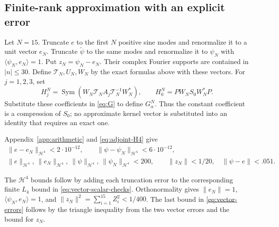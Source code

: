 \documentclass[a4paper,11pt]{article}
\numberwithin{equation}{section}
\theoremstyle{definition}
\theoremstyle{remark}
\newcommand{\Sym}{\operatorname{Sym}}
\newcommand{\norm}[1]{\lVert#1\rVert}
\newcommand{\ip}[2]{\langle#1,#2\rangle}
\newcommand{\calT}{\mathcal T}
\begin{document}
\subsection{Finite-rank approximation with an explicit error}
Let $N=15$. Truncate $e$ to the first $N$ positive sine modes and renormalize it to a unit vector $e_N$. Truncate $\widetilde\psi$ to the same modes and renormalize it to $\psi_N$ with $\ip{\psi_N}{e_N}=1$. Put $z_N=\psi_N-e_N$. Their complex Fourier supports are contained in $|n|\le30$. Define $\calT_N,U_N,W_N$ by the exact formulas above with these vectors. For $j=1,2,3$, set
\[
 H_j^N=\Sym(W_N\calT_N A_j\calT_N^{-1}W_N^*),\qquad
 H_0^N=PW_NS_0W_N^*P.
\]
Substitute these coefficients in \eqref{eq:G} to define $G_\alpha^N$. Thus the constant coefficient is a compression of $S_0$; no approximate kernel vector is substituted into an identity that requires an exact one.

Appendix~\ref{app:arithmetic} and \eqref{eq:adjoint-H4} give
\begin{equation}\label{eq:vector-errors}
\begin{gathered}
 \norm{e-e_N}_{\mathcal H^4}<2\cdot10^{-12},\qquad
 \norm{\psi-\psi_N}_{\mathcal H^4}<6\cdot10^{-12},\\
 \norm e_{\mathcal H^4},\ \norm{e_N}_{\mathcal H^4},\
 \norm\psi_{\mathcal H^4},\ \norm{\psi_N}_{\mathcal H^4}<200,
 \qquad \norm{z_N}<1/20,\quad \norm{\psi-e}<.051.
\end{gathered}
\end{equation}

The $\mathcal H^4$ bounds follow by adding each truncation error to
the corresponding finite $L_4$ bound in \eqref{eq:vector-scalar-checks}.
Orthonormality gives $\norm{e_N}=1$, $\ip{\psi_N}{e_N}=1$, and
$\norm{z_N}^2=\sum_{i=1}^{15}Z_i^2<1/400$.
The last bound in \eqref{eq:vector-errors} follows by the triangle inequality
from the two vector errors and the bound for $z_N$.
\end{document}
